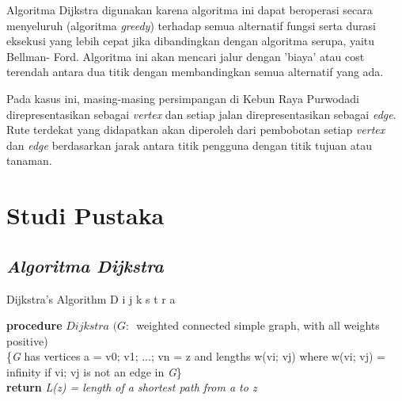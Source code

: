 \documentclass[conference]{IEEEtran}
\begin{document}
Algoritma Dijkstra digunakan karena algoritma ini dapat
beroperasi secara menyeluruh (algoritma \textit{greedy}) terhadap
semua alternatif fungsi serta durasi eksekusi yang lebih cepat
jika dibandingkan dengan algoritma serupa, yaitu Bellman-
Ford. Algoritma ini akan mencari jalur dengan ’biaya’ atau
cost terendah antara dua titik dengan membandingkan semua
alternatif yang ada.

Pada kasus ini, masing-masing persimpangan di Kebun
Raya Purwodadi direpresentasikan sebagai \textit{vertex} dan setiap
jalan direpresentasikan sebagai \textit{edge}. Rute terdekat yang didapatkan
akan diperoleh dari pembobotan setiap \textit{vertex} dan \textit{edge}
berdasarkan jarak antara titik pengguna dengan titik tujuan
atau tanaman.

\section{Studi Pustaka}
\subsection{\textit{Algoritma Dijkstra}}
\begin{algorithm}[hbt!]
\caption{Dijkstra's Algorithm D i j k s t r a}\label{alg:two}
\textbf{procedure} $\textit{Dijkstra (G: }$ weighted connected simple graph, with all weights positive)\\
\{\textit{G} has vertices a = v0; v1; ...; vn = z and lengths w(vi; vj) where w(vi; vj) = infinity if vi; vj is not an edge in \textit{G}\}\\
\textbf{return} \textit{L(z) = length of a shortest path from a to z}
\end{algorithm}
\end{document}
